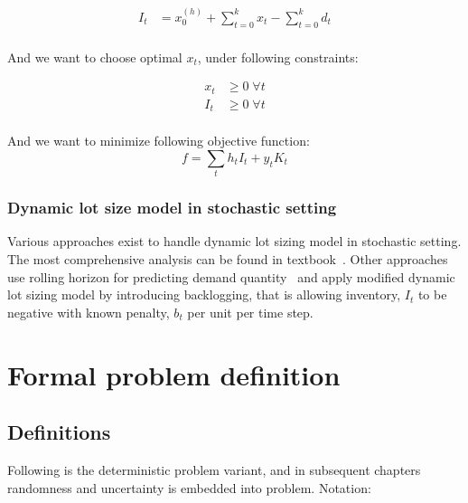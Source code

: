 \begin{align*}
  I_t &= x^{(h)}_0 + \sum_{t=0}^k{x_t} - \sum_{t=0}^k{d_t}\\
\end{align*}

And we want to choose optimal $x_t$, under following constraints:

\begin{align*}
  x_t &\ge 0 \; \forall t\\
  I_t &\ge 0 \; \forall t\\
\end{align*}

And we want to minimize following objective function:
\begin{equation*}
  f = \sum_t{h_t I_t + y_t K_t}
\end{equation*}


\subsubsection{Dynamic lot size model in stochastic setting}
\label{sub:Dynamic lot size model in stochastic setting}

Various approaches exist to handle dynamic lot sizing model in stochastic setting. The most comprehensive analysis can be found in textbook~\autocite{tempelmeier2013stochastic}. Other approaches use rolling horizon for predicting demand quantity~\autocite{cao2013adaptive} and apply modified dynamic lot sizing model by introducing backlogging, that is allowing inventory, $I_t$ to be negative with known penalty, $b_t$ per unit per time step.
\section{Formal problem definition}
\label{sec:prob-def}

\subsection{Definitions}
\label{sub:Definitions}

Following is the deterministic problem variant, and in subsequent chapters randomness and uncertainty is embedded into problem. Notation:

